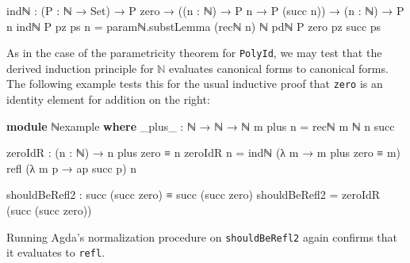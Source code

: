 \documentclass[
  12pt]{article}
\newenvironment{Shaded}{\begin{snugshade}}{\end{snugshade}}
\newcommand{\DataTypeTok}[1]{\textcolor[rgb]{0.00,0.34,0.68}{#1}}
\newcommand{\KeywordTok}[1]{\textcolor[rgb]{0.12,0.11,0.11}{\textbf{#1}}}
\newcommand{\NormalTok}[1]{\textcolor[rgb]{0.12,0.11,0.11}{#1}}
\newcommand{\OtherTok}[1]{\textcolor[rgb]{0.00,0.43,0.16}{#1}}
\begin{document}
\begin{Shaded}
\begin{Highlighting}[]
\NormalTok{indℕ }\OtherTok{:} \OtherTok{(}\NormalTok{P }\OtherTok{:}\NormalTok{ ℕ }\OtherTok{→} \DataTypeTok{Set}\OtherTok{)} \OtherTok{→}\NormalTok{ P zero }\OtherTok{→} \OtherTok{((}\NormalTok{n }\OtherTok{:}\NormalTok{ ℕ}\OtherTok{)} \OtherTok{→}\NormalTok{ P n }\OtherTok{→}\NormalTok{ P }\OtherTok{(}\NormalTok{succ n}\OtherTok{))} \OtherTok{→} \OtherTok{(}\NormalTok{n }\OtherTok{:}\NormalTok{ ℕ}\OtherTok{)} \OtherTok{→}\NormalTok{ P n}
\NormalTok{indℕ P pz ps n }\OtherTok{=}\NormalTok{ paramℕ}\OtherTok{.}\NormalTok{substLemma }\OtherTok{(}\NormalTok{recℕ n}\OtherTok{)}\NormalTok{ ℕ pdℕ P zero pz succ ps}
\end{Highlighting}
\end{Shaded}

As in the case of the parametricity theorem for \texttt{PolyId}, we may
test that the derived induction principle for \(\mathbb{N}\) evaluates
canonical forms to canonical forms. The following example tests this for
the usual inductive proof that \texttt{zero} is an identity element for
addition on the right:

\begin{Shaded}
\begin{Highlighting}[]
\KeywordTok{module}\NormalTok{ ℕexample }\KeywordTok{where}
    \OtherTok{\_}\NormalTok{plus}\OtherTok{\_} \OtherTok{:}\NormalTok{ ℕ }\OtherTok{→}\NormalTok{ ℕ }\OtherTok{→}\NormalTok{ ℕ}
\NormalTok{    m plus n }\OtherTok{=}\NormalTok{ recℕ m ℕ n succ}

\NormalTok{    zeroIdR }\OtherTok{:} \OtherTok{(}\NormalTok{n }\OtherTok{:}\NormalTok{ ℕ}\OtherTok{)} \OtherTok{→}\NormalTok{ n plus zero ≡ n}
\NormalTok{    zeroIdR n }\OtherTok{=}\NormalTok{ indℕ }\OtherTok{(λ}\NormalTok{ m }\OtherTok{→}\NormalTok{ m plus zero ≡ m}\OtherTok{)}\NormalTok{ refl }\OtherTok{(λ}\NormalTok{ m p }\OtherTok{→}\NormalTok{ ap succ p}\OtherTok{)}\NormalTok{ n}
    
\NormalTok{    shouldBeRefl2 }\OtherTok{:}\NormalTok{ succ }\OtherTok{(}\NormalTok{succ zero}\OtherTok{)}\NormalTok{ ≡ succ }\OtherTok{(}\NormalTok{succ zero}\OtherTok{)}
\NormalTok{    shouldBeRefl2 }\OtherTok{=}\NormalTok{ zeroIdR }\OtherTok{(}\NormalTok{succ }\OtherTok{(}\NormalTok{succ zero}\OtherTok{))}
\end{Highlighting}
\end{Shaded}

Running Agda's normalization procedure on \texttt{shouldBeRefl2} again
confirms that it evaluates to \texttt{refl}.
\end{document}

